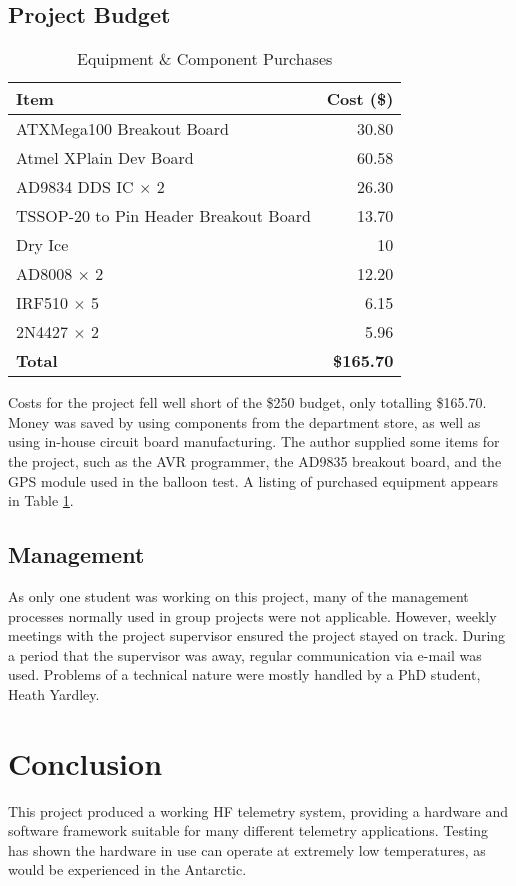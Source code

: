 \documentclass[a4paper,12pt]{article}
\begin{document}
\subsection{Project Budget}
\begin{table}[h]
\begin{center}
\caption{Equipment \& Component Purchases}
\begin{tabular}{l|r}
\hline
\textbf{Item} & \textbf{Cost (\$)}\\
\hline
ATXMega100 Breakout Board & 30.80\\
Atmel XPlain Dev Board & 60.58\\
AD9834 DDS IC $\times$ 2 & 26.30\\
TSSOP-20 to Pin Header Breakout Board & 13.70\\
Dry Ice & 10\\
AD8008 $\times$ 2 & 12.20\\
IRF510 $\times$ 5 & 6.15\\
2N4427 $\times$ 2 & 5.96\\
\hline
\textbf{Total} & \textbf{\$165.70}\\
\end{tabular}
\end{center}
\label{proj_costs}
\end{table}
Costs for the project fell well short of the \$250 budget, only totalling \$165.70. Money was saved by using components from the department store, as well as using in-house circuit board manufacturing. The author supplied some items for the project, such as the AVR programmer, the AD9835 breakout board, and the GPS module used in the balloon test. A listing of purchased equipment appears in Table \ref{proj_costs}.

\subsection{Management}
As only one student was working on this project, many of the management processes normally used in group projects were not applicable. However, weekly meetings with the project supervisor ensured the project stayed on track. During a period that the supervisor was away, regular communication via e-mail was used. Problems of a technical nature were mostly handled by a PhD student, Heath Yardley.

\section{Conclusion}
This project produced a working HF telemetry system, providing a hardware and software framework suitable for many different telemetry applications. Testing has shown the hardware in use can operate at extremely low temperatures, as would be experienced in the Antarctic.
\end{document}
